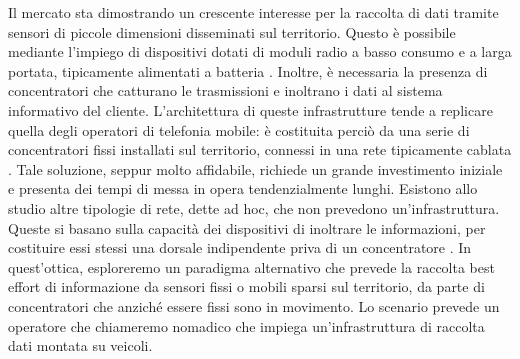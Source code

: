 \documentclass[a4paper,11pt]{article}
\theoremstyle{definition}
\begin{document}
Il mercato sta dimostrando un crescente interesse per la raccolta di dati tramite sensori di piccole dimensioni disseminati sul territorio. Questo è possibile mediante l'impiego di dispositivi dotati di moduli radio a basso consumo e a larga portata, tipicamente alimentati a batteria \cite{wsnsurvey}. Inoltre, è necessaria la presenza di concentratori che catturano le trasmissioni e inoltrano i dati al sistema informativo del cliente. L'architettura di queste infrastrutture tende a replicare quella degli operatori di telefonia mobile: è costituita perciò da una serie di concentratori fissi installati sul territorio, connessi in una rete tipicamente cablata \cite{loraspec}. Tale soluzione, seppur molto affidabile, richiede un grande investimento iniziale e presenta dei tempi di messa in opera tendenzialmente lunghi. Esistono allo studio altre tipologie di rete, dette ad hoc, che non prevedono un'infrastruttura. Queste si basano sulla capacità dei dispositivi di inoltrare le informazioni, per costituire essi stessi una dorsale indipendente priva di un concentratore \cite{mobileadhoc}. In quest'ottica, esploreremo un paradigma alternativo che prevede la raccolta best effort di informazione da sensori fissi o mobili sparsi sul territorio, da parte di concentratori che anziché essere fissi sono in movimento. Lo scenario prevede un operatore che chiameremo nomadico che impiega un'infrastruttura di raccolta dati montata su veicoli.




\end{document}
